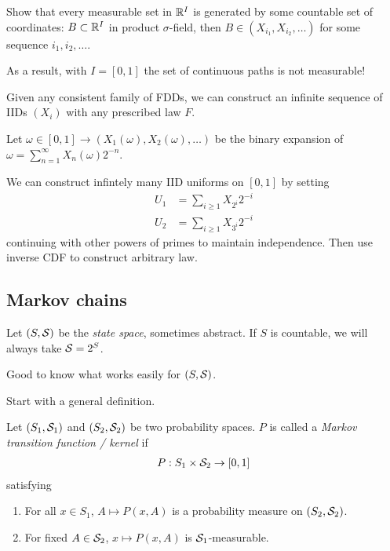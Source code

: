 \begin{exercise}
  Show that every measurable set in $\mathbb{R}^I$ is generated by some countable
  set of coordinates: $B \subset \mathbb{R}^I$ in product $\sigma$-field, then
  $B \in (X_{i_1}, X_{i_2}, \ldots)$ for some sequence $i_1, i_2, \ldots$.

  As a result, with $I = [0,1]$ the set of continuous paths is not
  measurable!
\end{exercise}

\begin{example}
  Given any consistent family of FDDs, we can construct an infinite sequence of
  IIDs $(X_i)$ with any prescribed law $F$.

  Let $\omega \in [0,1] \to (X_1(\omega), X_2(\omega), \ldots)$ be
  the binary expansion of $\omega = \sum_{n=1}^\infty X_n(\omega) 2^{-n}$.

  We can construct infintely many IID uniforms on $[0,1]$ by setting
  \begin{align*}
    U_1 &= \sum_{i \geq 1} X_{2^i} 2^{-i}\\
    U_2 &= \sum_{i \geq 1} X_{3^i} 2^{-i}
  \end{align*}
  continuing with other powers of primes to maintain independence.
  Then use inverse CDF to construct arbitrary law.
\end{example}

\subsection{Markov chains}%
\label{sub:Markov chains}

Let $(S, \mathcal{S})$ be the \emph{state space}, sometimes abstract.
If $S$ is countable, we will always take $\mathcal{S} = 2^S$.

Good to know what works easily for $(S, \mathcal{S})$.

Start with a general definition.

\begin{definition}
  Let $(S_1, \mathcal{S}_1)$ and $(S_2, \mathcal{S}_2)$
  be two probability spaces.
  $P$ is called a \emph{Markov transition function / kernel} if
  \begin{align*}
    P : S_1 \times \mathcal{S}_2 \to [0,1]
  \end{align*}
  satisfying
  \begin{enumerate}
    \item For all $x \in S_1$, $A \mapsto P(x, A)$ is a probability measure
      on $(S_2, \mathcal{S}_2)$.
    \item For fixed $A \in \mathcal{S}_2$, $x \mapsto P(x, A)$ is $\mathcal{S}_1$-measurable.
  \end{enumerate}
\end{definition}

